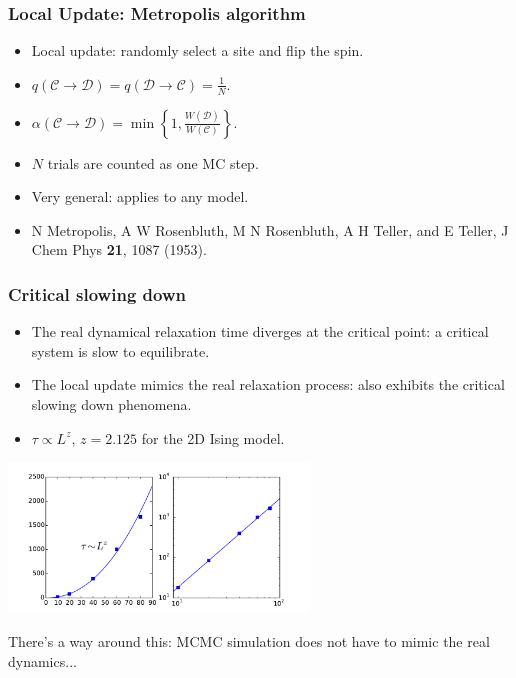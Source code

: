 \documentclass[xcolor=table, 10pt, aspectratio=169]{beamer}
\begin{document}
\begin{frame}
  \frametitle{Local Update: Metropolis algorithm}
  \begin{center}
  \end{center}
  \begin{itemize}
    \item Local update: randomly select a site and flip the spin.
    \item $q(\mathcal C\rightarrow\mathcal D) = q(\mathcal D\rightarrow\mathcal C) = \frac1N$.
    \item $\alpha(\mathcal C\rightarrow\mathcal D)=\min\left\{1,\frac{W(\mathcal D)}{W(\mathcal C)}\right\}.$
    \item $N$ trials are counted as one MC step.
    \item Very general: applies to any model.
    \item N Metropolis, A W Rosenbluth, M N Rosenbluth, A H Teller, and E Teller, J Chem Phys \textbf{21}, 1087 (1953).
  \end{itemize}
\end{frame}

\begin{frame}
  \frametitle{Critical slowing down}
  \begin{itemize}
    \item The real dynamical relaxation time diverges at the critical point: a critical system is slow to equilibrate.
    \item The local update mimics the real relaxation process: also exhibits the critical slowing down phenomena.
    \item $\tau\propto L^z$, $z=2.125$ for the 2D Ising model.
  \end{itemize}
  \begin{center}
    \includegraphics[width=8cm]{slowdown}
  \end{center}
  There's a way around this: MCMC simulation does not have to mimic the real dynamics...
\end{frame}
\end{document}
